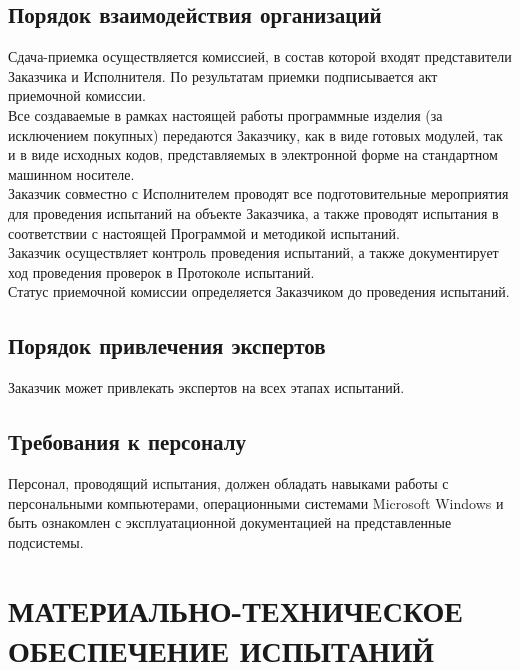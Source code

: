 \documentclass[russian, utf8, 12pt,pointsubsection,floatsubsection]{eskdtext}
\begin{document}
\subsection{Порядок взаимодействия организаций}
Сдача-приемка осуществляется комиссией, в состав которой входят представители Заказчика и Исполнителя. По результатам приемки подписывается акт приемочной комиссии.\\

Все создаваемые в рамках настоящей работы программные изделия (за исключением
покупных) передаются Заказчику, как в виде готовых модулей, так и в виде исходных кодов,
представляемых в электронной форме на стандартном машинном носителе.\\

Заказчик совместно с Исполнителем проводят все подготовительные мероприятия для проведения испытаний на объекте Заказчика, а также проводят испытания в соответствии с настоящей Программой и методикой испытаний.\\

Заказчик осуществляет контроль проведения испытаний, а также документирует ход проведения проверок в Протоколе испытаний.\\

Статус приемочной комиссии определяется Заказчиком до проведения испытаний.\\
\subsection{Порядок привлечения экспертов}
Заказчик может привлекать экспертов на всех этапах испытаний.

\subsection{Требования к персоналу}
Персонал, проводящий испытания, должен обладать навыками работы с персональными компьютерами, операционными системами Microsoft Windows и быть ознакомлен с эксплуатационной документацией на представленные подсистемы.\\


\section{МАТЕРИАЛЬНО-ТЕХНИЧЕСКОЕ ОБЕСПЕЧЕНИЕ ИСПЫТАНИЙ}
\end{document}
